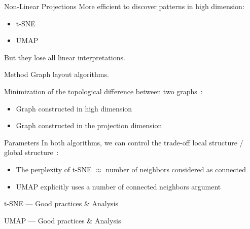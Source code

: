 \begin{frame}{Non-Linear Projections}
  More efficient to discover patterns in high dimension:

  \begin{itemize}
    \item t-SNE
    \item UMAP
  \end{itemize}
  But they lose all linear interpretations.
\end{frame}


\begin{frame}{Method}
  Graph layout algorithms.

  Minimization of the topological difference between two graphs~:

  \begin{itemize}
    \item Graph constructed in high dimension
    \item Graph constructed in the projection dimension
  \end{itemize}
\end{frame}

\begin{frame}{Parameters}
  In both algorithms, we can control the trade-off local structure / global structure~:

  \begin{itemize}
    \item The perplexity of t-SNE $\approx$ number of neighbors considered as connected
    \item UMAP explicitly uses a number of connected neighbors argument
  \end{itemize}
\end{frame}

\begin{frame}{t-SNE --- Good practices \& Analysis}
\end{frame}

\begin{frame}{UMAP --- Good practices \& Analysis}
\end{frame}

